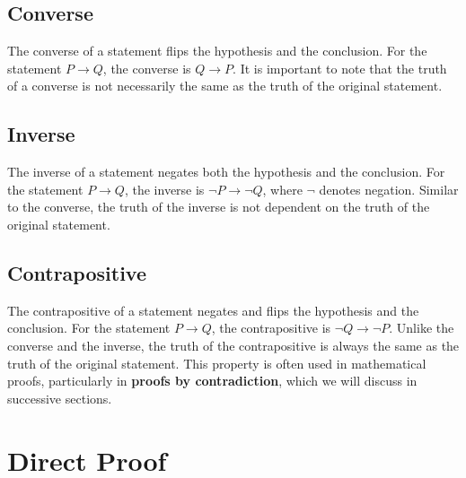 \documentclass[
	12pt, %
	fleqn, %
	a4paper, %
]{LegrandOrangeBook}
\begin{document}
\subsection*{Converse}
The converse of a statement flips the hypothesis and the conclusion. For the statement \(P \rightarrow Q\), the converse is \(Q \rightarrow P\). It is important to note that the truth of a converse is not necessarily the same as the truth of the original statement.

\subsection*{Inverse}
The inverse of a statement negates both the hypothesis and the conclusion. For the statement \(P \rightarrow Q\), the inverse is \(\neg P \rightarrow \neg Q\), where \(\neg\) denotes negation. Similar to the converse, the truth of the inverse is not dependent on the truth of the original statement.

\subsection*{Contrapositive}
The contrapositive of a statement negates and flips the hypothesis and the conclusion. For the statement \(P \rightarrow Q\), the contrapositive is \(\neg Q \rightarrow \neg P\). Unlike the converse and the inverse, the truth of the contrapositive is always the same as the truth of the original statement. This property is often used in mathematical proofs, particularly in \textbf{proofs by contradiction}, which we will discuss in successive sections.

\section{Direct Proof}
\end{document}
